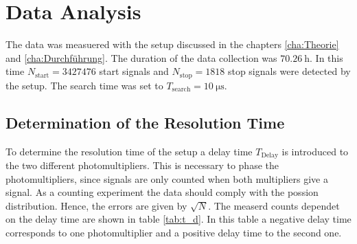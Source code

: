 \chapter{Data Analysis}
\label{cha:Auswertung}
The data was measuered with the setup discussed in the chapters \ref{cha:Theorie} and \ref{cha:Durchführung}. The duration of the data collection was $\qty{70.26}{\hour}$. In this 
time $N_{\mathrm{start}} = \num{3427476}$ start signals and $N_{\mathrm{stop}} = \num{1818}$ stop signals were detected by the setup. The search time was set to 
$T_\mathrm{search} = \qty{10}{\micro\second}$.

\section{Determination of the Resolution Time}
\label{sec:resoltion time}
To determine the resolution time of the setup a delay time $T_\mathrm{Delay}$ is introduced to the two different photomultipliers. This is necessary to phase the photomultipliers,
since signals are only counted when both multipliers give a signal. As a counting experiment the data should comply with the possion distribution. Hence, the errors are given 
by $\sqrt{N}$. The measerd counts dependet on the delay time are shown in table \ref{tab:t_d}. In this table a negative delay time corresponds to one photomultiplier and a positive 
delay time to the second one. 


